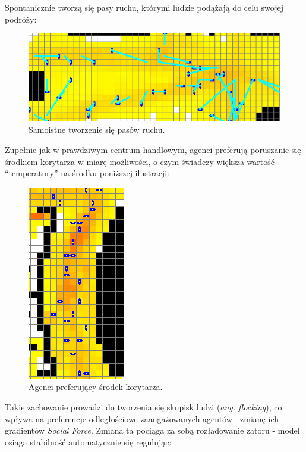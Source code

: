 \documentclass[a4paper, 12pt]{article}
\begin{document}
\noindent
Spontanicznie tworzą się pasy ruchu, którymi ludzie podążają do celu swojej podróży:

        \begin{figure}[H]
          \centering
          \includegraphics[scale=0.7]{./img/lanes.png}
          \caption{Samoistne tworzenie się pasów ruchu.}
          \label{fig:res-lanes}
        \end{figure}

\noindent
Zupełnie jak w prawdziwym centrum handlowym, agenci preferują poruszanie się środkiem korytarza w miarę możliwości, o czym świadczy większa wartość ``temperatury'' na środku poniższej ilustracji:

        \begin{figure}[H]
          \centering
          \includegraphics[scale=0.7]{./img/middle.png}
          \caption{Agenci preferujący środek korytarza.}
          \label{fig:res-middle}
        \end{figure}

\noindent
Takie zachowanie prowadzi do tworzenia się skupisk ludzi (\emph{ang. flocking}), co wpływa na preferencje odległościowe zaangażowanych agentów i zmianę ich gradientów \emph{Social Force}. Zmiana ta pociąga za sobą rozładowanie zatoru - model osiąga stabilność automatycznie się regulując:
\end{document}
